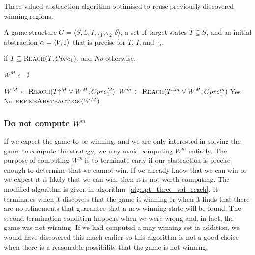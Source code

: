 \begin{algorithm}
\caption{Three-valued abstraction algorithm optimised to reuse previously discovered winning regions.}
\label{alg:three_val_reach_reuse}

\begin{algorithmic}[1]

\Require A game structure $G = \langle S, L, I, \tau_1, \tau_2, \delta \rangle$, a set 
of target states $T\subseteq S$, and an initial abstraction $\alpha=\langle V, \mathord{\downarrow} \rangle$
that is precise for $T$, $I$, and $\tau_i$.

 if $I \subseteq \textsc{Reach}(T, Cpre_1)$, and {\it No} otherwise.


    \State $W^M \gets \emptyset$

    \Loop
        \State $W^M \gets \textsc{Reach}(T\mathord{\uparrow^M} \vee W^M, Cpre_1^M)$
        \State $W^m \gets \textsc{Reach}(T\mathord{\uparrow^m} \vee W^M, Cpre_1^m)$
            \State\Return Yes
            \State\Return No
        \Else       
            \State$\Call{refineAbstraction}{W^M}$
        \EndIf
    \EndLoop
\EndFunction

\end{algorithmic}
\end{algorithm}

\subsubsection{Do not compute $W^m$}

If we expect the game to be winning, and we are only interested in solving the game to compute the strategy, we may avoid computing $W^m$ entirely. The purpose of computing $W^m$ is to terminate early if our abstraction is precise enough to determine that we cannot win. If we already know that we can win or we expect it is likely that we can win, then it is not worth computing. The modified algorithm is given in algorithm~\ref{alg:opt_three_val_reach}. It terminates when it discovers that the game is winning or when it finds that there are no refinements that guarantee that a new winning state will be found. The second termination condition happens when we were wrong and, in fact, the game was not winning. If we had computed a may winning set in addition, we would have discovered this much earlier so this algorithm is not a good choice when there is a reasonable possibility that the game is not winning.

